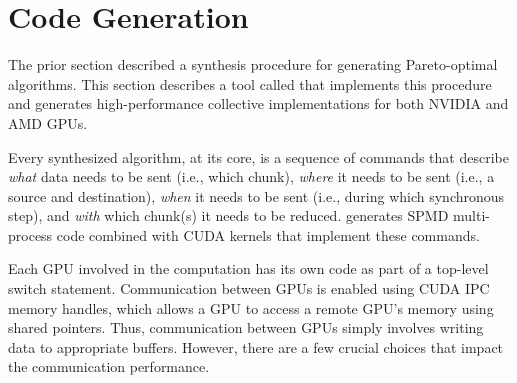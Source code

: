 \section{Code Generation}
\label{sec:lowering}
The prior section described a synthesis procedure for generating
Pareto-optimal algorithms. This section describes a tool called
\tool{} that implements this procedure and generates high-performance
collective implementations for both NVIDIA and AMD GPUs.


Every synthesized algorithm, at its core, is a sequence of commands
that describe \emph{what} data needs to be sent (i.e., which chunk),
\emph{where} it needs to be sent (i.e., a source and destination),
\emph{when} it needs to be sent (i.e., during which synchronous step),
and \emph{with} which chunk(s) it needs to be reduced. \tool{}
generates SPMD multi-process \CC{} code combined with CUDA kernels
that implement these commands.

Each GPU involved in the computation has its own code as part of a
top-level switch statement. Communication between GPUs is enabled
using CUDA IPC memory handles, which allows a GPU to access a remote
GPU's memory using shared pointers. Thus, communication between GPUs
simply involves writing data to appropriate buffers. However, there
are a few crucial choices that impact the communication performance.





